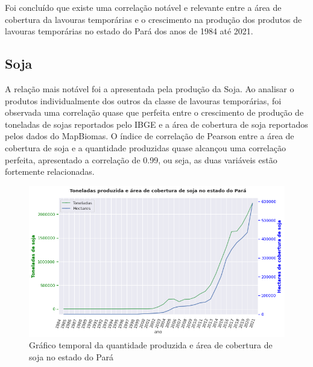 \newpage
Foi concluído que existe uma correlação notável e relevante entre a área de cobertura da lavouras temporárias e o crescimento na produção dos produtos de lavouras temporárias no estado do Pará dos anos de 1984 até 2021.





\subsection{Soja}

A relação mais notável foi a apresentada pela produção da Soja. Ao analisar o produtos individualmente dos outros da classe de lavouras temporárias, foi observada uma correlação quase que perfeita entre o crescimento de produção de toneladas de sojas reportados pelo IBGE e a área de cobertura de soja reportados pelos dados do MapBiomas. O índice de correlação de Pearson entre a área de cobertura de soja e a quantidade produzidas quase alcançou uma correlação perfeita, apresentado a correlação de 0.99, ou seja, as duas variáveis estão fortemente relacionadas.


\begin{figure}[hbt!]
    \centering
    \includegraphics[width=0.7\columnwidth]{src/plots/plot-soja.png}
    \centering
    \caption{Gráfico temporal da quantidade produzida e área de cobertura de soja no estado do Pará}
    \label{fig:cobertura_pastagem-numero_cabeca}
\end{figure}



